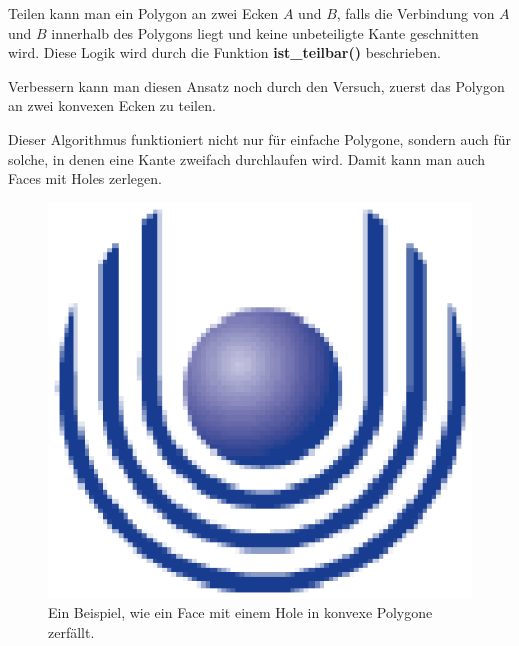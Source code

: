 Teilen kann man ein Polygon an zwei Ecken $A$ und $B$, falls die Verbindung von $A$ und $B$ innerhalb des Polygons liegt und keine unbeteiligte Kante geschnitten wird. Diese Logik wird durch die Funktion \textbf{ist\_teilbar()} beschrieben.

Verbessern kann man diesen Ansatz noch durch den Versuch, zuerst das Polygon an zwei konvexen Ecken zu teilen.

Dieser Algorithmus funktioniert nicht nur für einfache Polygone, sondern auch für solche, in denen eine Kante zweifach durchlaufen wird. Damit kann man auch Faces mit Holes zerlegen.

\begin{figure}
	\centering
	\includegraphics{feu_logo2.eps}
	\caption{Ein Beispiel, wie ein Face mit einem Hole in konvexe Polygone zerfällt.}
	\label{fig:ZerlegungFace}
\end{figure}


